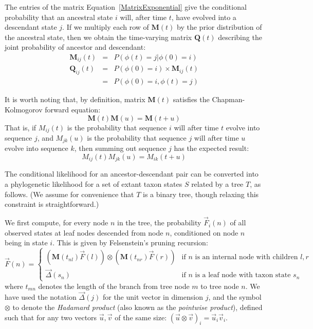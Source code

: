 \documentclass{bmcart}
\newcommand{\matr}[1]{\mathbf{#1}}
\newcommand{\eqref}[1]{Equation~\ref{#1}}
\begin{document}
The entries of the matrix \eqref{MatrixExponential} give the conditional probability
that an ancestral state $i$ will, after time $t$, have evolved into a descendant state $j$.
If we multiply each row of $\matr{M}(t)$ by the prior distribution of the ancestral state,
then we obtain the time-varying matrix $\matr{Q}(t)$ describing the joint probability of ancestor and descendant:
\begin{eqnarray}
\matr{M}_{ij}(t) & = & P(\phi(t)=j|\phi(0)=i) \\
\matr{Q}_{ij}(t) & = & P(\phi(0)=i) \times \matr{M}_{ij}(t) \label{JointLikelihood} \\
& = & P(\phi(0)=i,\phi(t)=j)
\end{eqnarray}

It is worth noting that, by definition, matrix $\matr{M}(t)$ satisfies the
Chapman-Kolmogorov forward equation:
\begin{equation}
\matr{M}(t) \matr{M}(u) = \matr{M}(t+u)
\label{ChapmanKolmogorov}
\end{equation}
That is, if $M_{ij}(t)$ is the probability
that sequence $i$ will after time $t$ evolve into sequence $j$,
and $M_{jk}(u)$ is the probability that sequence $j$ will after time $u$ evolve into sequence $k$,
then summing out sequence $j$ has the expected result:
\[
M_{ij}(t) M_{jk}(u) = M_{ik}(t+u)
\]

The conditional likelihood for an ancestor-descendant pair can be converted
into a phylogenetic likelihood for a set of extant taxon states $S$ related by a tree $T$,
as follows.
(We assume for convenience that $T$ is a binary tree, though relaxing this constraint is straightforward.)

We first compute, for every node $n$ in the tree,
the probability $\vec{F}_i(n)$
of all observed states at leaf nodes descended from node $n$,
conditioned on node $n$ being in state $i$.
This is given by Felsenstein's pruning recursion:
\begin{equation}
\vec{F}(n) = \left\{
\begin{array}{ll}
\displaystyle
\left( \matr{M}(t_{nl}) \vec{F}(l) \right)
\otimes
\left( \matr{M}(t_{nr}) \vec{F}(r) \right)
& \mbox{if $n$ is an internal node with children $l,r$} \\
\displaystyle
\vec{\Delta}(s_n)
& \mbox{if $n$ is a leaf node with taxon state $s_n$}
\end{array}
\right.
\label{Felsenstein}
\end{equation}
where $t_{mn}$ denotes the length of the branch from tree node $m$ to tree node $n$.
We have used the notation
$\vec{\Delta}(j)$ for the unit vector in dimension $j$,
and the symbol
$\otimes$ to denote the {\em Hadamard product} (also known as the {\em pointwise product}),
defined such that for any two vectors $\vec{u},\vec{v}$ of the same size:
$(\vec{u} \otimes \vec{v})_i = \vec{u}_i \vec{v}_i$.
\end{document}
